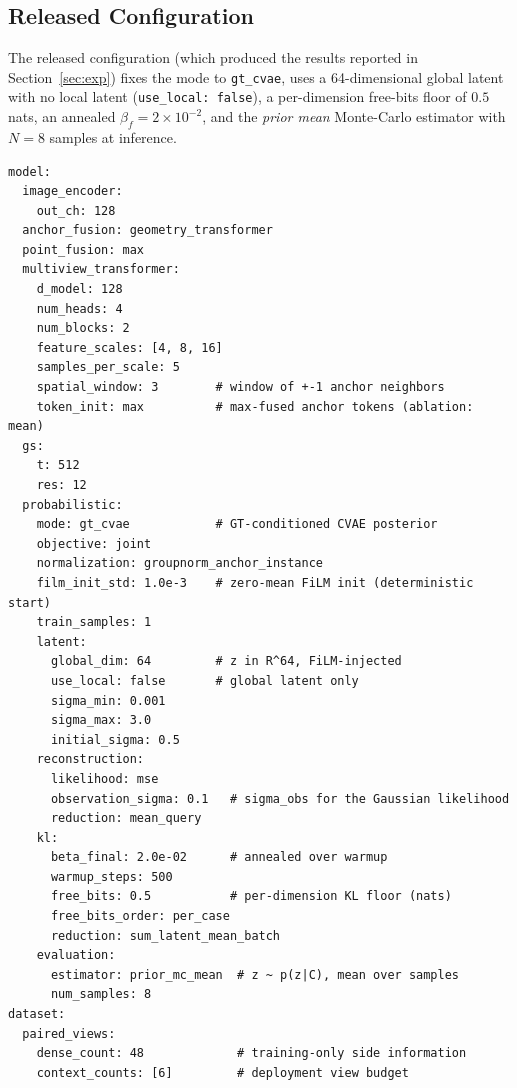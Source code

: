 \subsection{Released Configuration}
\label{app:code:config}

The released configuration (which produced the results reported in
Section~\ref{sec:exp}) fixes the mode to \texttt{gt\_cvae}, uses a
64-dimensional global latent with no local latent
(\texttt{use\_local: false}), a per-dimension free-bits floor of
$0.5$ nats, an annealed $\beta_f=2{\times}10^{-2}$, and the
\emph{prior mean} Monte-Carlo estimator with $N{=}8$ samples at
inference.

\begin{lstlisting}[caption={configs/experiment\_plan/stage1/
prob-gt-cvae.yaml (excerpt): the released model, objective and
evaluation blocks. \texttt{posterior\_decoder\_views} is not a config
key; the code default is \texttt{'context'}.},
label={lst:config}]
model:
  image_encoder:
    out_ch: 128
  anchor_fusion: geometry_transformer
  point_fusion: max
  multiview_transformer:
    d_model: 128
    num_heads: 4
    num_blocks: 2
    feature_scales: [4, 8, 16]
    samples_per_scale: 5
    spatial_window: 3        # window of +-1 anchor neighbors
    token_init: max          # max-fused anchor tokens (ablation: mean)
  gs:
    t: 512
    res: 12
  probabilistic:
    mode: gt_cvae            # GT-conditioned CVAE posterior
    objective: joint
    normalization: groupnorm_anchor_instance
    film_init_std: 1.0e-3    # zero-mean FiLM init (deterministic start)
    train_samples: 1
    latent:
      global_dim: 64         # z in R^64, FiLM-injected
      use_local: false       # global latent only
      sigma_min: 0.001
      sigma_max: 3.0
      initial_sigma: 0.5
    reconstruction:
      likelihood: mse
      observation_sigma: 0.1   # sigma_obs for the Gaussian likelihood
      reduction: mean_query
    kl:
      beta_final: 2.0e-02      # annealed over warmup
      warmup_steps: 500
      free_bits: 0.5           # per-dimension KL floor (nats)
      free_bits_order: per_case
      reduction: sum_latent_mean_batch
    evaluation:
      estimator: prior_mc_mean  # z ~ p(z|C), mean over samples
      num_samples: 8
dataset:
  paired_views:
    dense_count: 48             # training-only side information
    context_counts: [6]         # deployment view budget
\end{lstlisting}
